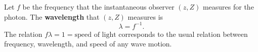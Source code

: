 Let $f$ be the frequency that the instantaneous observer $(z, Z)$ measures for the photon. The \textbf{wavelength} that $(z, Z)$ measures is
$$
\lambda = f^{-1}.
$$
The relation $f\lambda = 1 = \text{speed of light}$ corresponds to the usual relation between frequency, wavelength, and speed of any wave motion.
